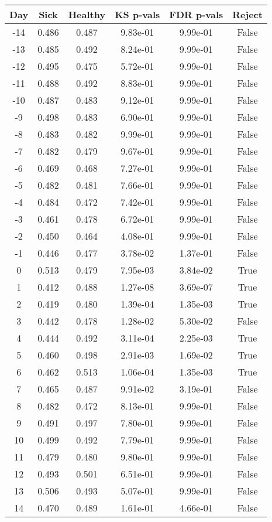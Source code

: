 \begin{tabular}{c|c|c|c|c|c}
Day &  Sick & Healthy &  KS p-vals & FDR p-vals & Reject\\
\hline
-14 & 0.486 &   0.487 &   9.83e-01 &   9.99e-01 &  False\\
-13 & 0.485 &   0.492 &   8.24e-01 &   9.99e-01 &  False\\
-12 & 0.495 &   0.475 &   5.72e-01 &   9.99e-01 &  False\\
-11 & 0.488 &   0.492 &   8.83e-01 &   9.99e-01 &  False\\
-10 & 0.487 &   0.483 &   9.12e-01 &   9.99e-01 &  False\\
 -9 & 0.498 &   0.483 &   6.90e-01 &   9.99e-01 &  False\\
 -8 & 0.483 &   0.482 &   9.99e-01 &   9.99e-01 &  False\\
 -7 & 0.482 &   0.479 &   9.67e-01 &   9.99e-01 &  False\\
 -6 & 0.469 &   0.468 &   7.27e-01 &   9.99e-01 &  False\\
 -5 & 0.482 &   0.481 &   7.66e-01 &   9.99e-01 &  False\\
 -4 & 0.484 &   0.472 &   7.42e-01 &   9.99e-01 &  False\\
 -3 & 0.461 &   0.478 &   6.72e-01 &   9.99e-01 &  False\\
 -2 & 0.450 &   0.464 &   4.08e-01 &   9.99e-01 &  False\\
 -1 & 0.446 &   0.477 &   3.78e-02 &   1.37e-01 &  False\\
  0 & 0.513 &   0.479 &   7.95e-03 &   3.84e-02 &   True\\
  1 & 0.412 &   0.488 &   1.27e-08 &   3.69e-07 &   True\\
  2 & 0.419 &   0.480 &   1.39e-04 &   1.35e-03 &   True\\
  3 & 0.442 &   0.478 &   1.28e-02 &   5.30e-02 &  False\\
  4 & 0.444 &   0.492 &   3.11e-04 &   2.25e-03 &   True\\
  5 & 0.460 &   0.498 &   2.91e-03 &   1.69e-02 &   True\\
  6 & 0.462 &   0.513 &   1.06e-04 &   1.35e-03 &   True\\
  7 & 0.465 &   0.487 &   9.91e-02 &   3.19e-01 &  False\\
  8 & 0.482 &   0.472 &   8.13e-01 &   9.99e-01 &  False\\
  9 & 0.491 &   0.497 &   7.80e-01 &   9.99e-01 &  False\\
 10 & 0.499 &   0.492 &   7.79e-01 &   9.99e-01 &  False\\
 11 & 0.479 &   0.480 &   9.80e-01 &   9.99e-01 &  False\\
 12 & 0.493 &   0.501 &   6.51e-01 &   9.99e-01 &  False\\
 13 & 0.506 &   0.493 &   5.07e-01 &   9.99e-01 &  False\\
 14 & 0.470 &   0.489 &   1.61e-01 &   4.66e-01 &  False\\
\end{tabular}